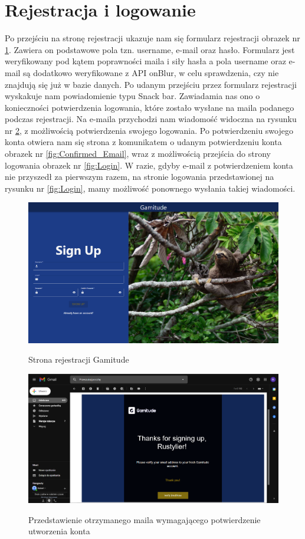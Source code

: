 \documentclass[a4paper,11pt]{report}
\begin{document}
\section{Rejestracja i logowanie}
Po przejściu na stronę rejestracji ukazuje nam się formularz rejestracji obrazek nr \ref{fig:Register}. Zawiera on podstawowe pola tzn. username, e-mail oraz hasło.
Formularz jest weryfikowany pod kątem poprawności maila i siły hasła
 a pola username oraz e-mail są dodatkowo weryfikowane z API onBlur, w celu sprawdzenia, czy nie znajdują się już w bazie danych. 
Po udanym przejściu przez formularz rejestracji wyskakuje nam powiadomienie typu Snack bar. 
Zawiadamia nas ono o konieczności potwierdzenia logowania, które zostało wysłane na maila podanego podczas rejestracji.
Na e-maila przychodzi nam wiadomość widoczna na rysunku nr \ref{fig:Email}, z możliwością potwierdzenia swojego logowania.
Po potwierdzeniu swojego konta otwiera nam się strona z komunikatem o udanym potwierdzeniu konta obrazek nr \ref{fig:Confirmed_Email}, wraz z możliwością przejścia do strony logowania obrazek nr \ref{fig:Login}.
W razie, gdyby e-mail z potwierdzeniem konta nie przyszedł za pierwszym razem,
 na stronie logowania przedstawionej na rysunku nr \ref{fig:Login}, mamy możliwość ponownego wysłania takiej wiadomości.
\begin{figure}[H]
	\centering
	\includegraphics[scale=0.3]{prezentacja/Register}\\
	\caption{Strona rejestracji Gamitude}
	\label{fig:Register}
\end{figure}
\begin{figure}[H]
	\centering
	\includegraphics[scale=0.3]{prezentacja/Email}\\
	\caption{Przedstawienie otrzymanego maila wymagającego potwierdzenie utworzenia konta}
	\label{fig:Email}
\end{figure}
\end{document}
